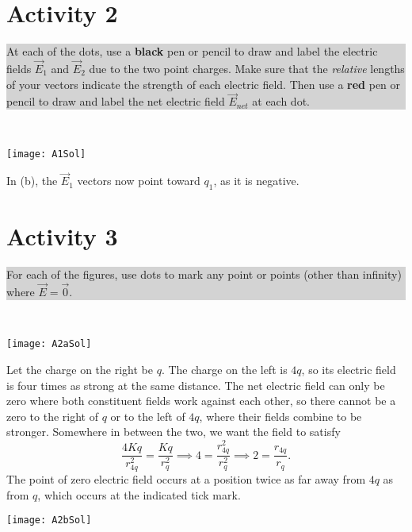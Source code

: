 \documentclass[]{article}
\newcommand{\excerpt}[1]{\colorbox{lightgray}{\parbox{14.8cm}{#1}} \\}
\begin{document}

\section*{Activity 2}%
\excerpt{
At each of the dots, use a \textbf{black} pen or pencil to draw and label the electric fields $ \vec{E}_{1} $ and $ \vec{E}_{2} $ due to the two point charges. Make sure that the \textit{relative} lengths of your vectors indicate the strength of each electric field. Then use a \textbf{red} pen or pencil to draw and label the net electric field $ \vec{E}_{net} $ at each dot.
}
\begin{center}
	\texttt{[image: A1Sol]}%
\end{center}

In (b), the $ \vec{E}_{1} $ vectors now point toward $ q_{1} $, as it is negative.

\pagebreak
\section*{Activity 3}%
\excerpt{
For each of the figures, use dots to mark any point or points (other than infinity) where $ \vec{E} = \vec{0} $.
}
\begin{center}
	\texttt{[image: A2aSol]}%
\end{center}

Let the charge on the right be $ q $. The charge on the left is $ 4q $, so its electric field is four times as strong at the same distance. The net electric field can only be zero where both constituent fields work against each other, so there cannot be a zero to the right of $ q $ or to the left of $ 4q $, where their fields combine to be stronger. Somewhere in between the two, we want the field to satisfy
\[
\frac{4Kq}{r_{4q}^{2}} = \frac{Kq}{r_{q}^{2}} \implies 4 = \frac{r_{4q}^{2}}{r_{q}^{2}} \implies 2 = \frac{r_{4q}}{r_{q}}.
\]
The point of zero electric field occurs at a position twice as far away from $ 4q $ as from $ q $, which occurs at the indicated tick mark.

\begin{center}
	\texttt{[image: A2bSol]}%
\end{center}
\end{document}
